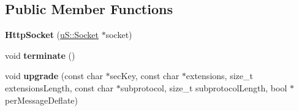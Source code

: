 \subsection*{Public Member Functions}
\begin{DoxyCompactItemize}
\item 
\mbox{\label{structu_w_s_1_1_http_socket_a18eca91d175822bc50cccaead349e8d1}} 
{\bfseries Http\+Socket} (\mbox{\hyperlink{structu_s_1_1_socket}{u\+S\+::\+Socket}} $\ast$socket)
\item 
\mbox{\label{structu_w_s_1_1_http_socket_a771c9e94fc3722a260fe74f880a1c7d5}} 
void {\bfseries terminate} ()
\item 
\mbox{\label{structu_w_s_1_1_http_socket_ab907cb5900ccba171456a2c146d48129}} 
void {\bfseries upgrade} (const char $\ast$sec\+Key, const char $\ast$extensions, size\+\_\+t extensions\+Length, const char $\ast$subprotocol, size\+\_\+t subprotocol\+Length, bool $\ast$per\+Message\+Deflate)
\end{DoxyCompactItemize}
